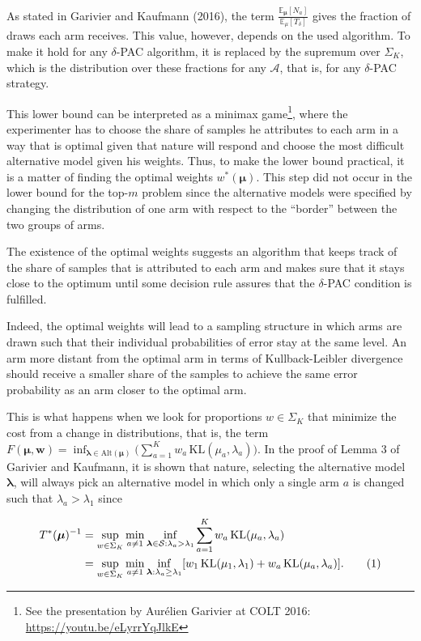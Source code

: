 \documentclass[11pt,]{article}
\let\rmarkdownfootnote\footnote%
\def\footnote{\protect\rmarkdownfootnote}
\newcommand{\KL}{\,\text{KL}}
\newcommand*{\Alignyesnumber}{\refstepcounter{equation}\tag{\theequation}}%
\begin{document}
As stated in Garivier and Kaufmann (2016), the term
\(\frac{\mathbb{E}_{\bm{\mu}}[N_a]}{\mathbb{E}_{\mu}[T_{\delta}]}\)
gives the fraction of draws each arm receives. This value, however,
depends on the used algorithm. To make it hold for any \(\delta\)-PAC
algorithm, it is replaced by the supremum over \(\Sigma_K\), which is
the distribution over these fractions for any \(\mathcal{A}\), that is,
for any \(\delta\)-PAC strategy.

This lower bound can be interpreted as a minimax game\footnote{See the
  presentation by Aurélien Garivier at COLT 2016:
  \url{https://youtu.be/eLyrrYqJlkE}}, where the experimenter has to
choose the share of samples he attributes to each arm in a way that is
optimal given that nature will respond and choose the most difficult
alternative model given his weights. Thus, to make the lower bound
practical, it is a matter of finding the optimal weights
\(w^*(\bm{\mu})\). This step did not occur in the lower bound for the
top-\(m\) problem since the alternative models were specified by
changing the distribution of one arm with respect to the ``border''
between the two groups of arms.

The existence of the optimal weights suggests an algorithm that keeps
track of the share of samples that is attributed to each arm and makes
sure that it stays close to the optimum until some decision rule assures
that the \(\delta\)-PAC condition is fulfilled.

Indeed, the optimal weights will lead to a sampling structure in which
arms are drawn such that their individual probabilities of error stay at
the same level. An arm more distant from the optimal arm in terms of
Kullback-Leibler divergence should receive a smaller share of the
samples to achieve the same error probability as an arm closer to the
optimal arm.

This is what happens when we look for proportions \(w \in \Sigma_K\)
that minimize the cost from a change in distributions, that is, the term
\(F(\bm{\mu}, \bm{w}) = \inf_{\bm{\lambda} \in \text{Alt}(\bm{\mu})} \Big(\sum_{a= 1}^K w_a \KL(\mu_a, \lambda_a)\Big)\).
In the proof of Lemma 3 of Garivier and Kaufmann, it is shown that
nature, selecting the alternative model \(\bm{\lambda}\), will always
pick an alternative model in which only a single arm \(a\) is changed
such that \(\lambda_a > \lambda_1\) since

\begin{align*}
T^*(\bm{\mu})^{-1} & = \sup_{w \in \Sigma_K} \min_{a \neq 1} \inf_{\bm{\lambda} \in \mathcal{S}: \lambda_a > \lambda_1} \sum_{a=1}^K w_a \KL(\mu_a, \lambda_a)  \\
& = \sup_{w \in \Sigma_K} \min_{a \neq 1} \inf_{\bm{\lambda}: \lambda_a \geq \lambda_1} [w_1 \KL(\mu_1, \lambda_1)+w_a \KL(\mu_a, \lambda_a)]. \Alignyesnumber\label{eqn:ComplexityTrackStopStrategy}
\end{align*}
\end{document}
